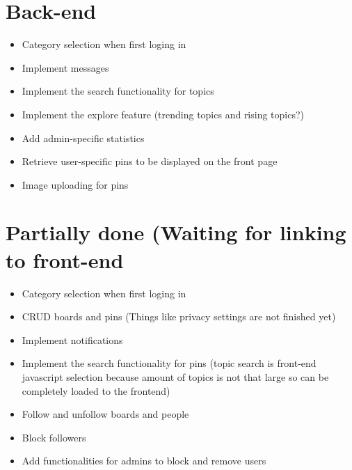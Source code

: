 \documentclass{article}
\begin{document}
\section{Back-end}
\begin{itemize}
\item Category selection when first loging in
\item Implement messages
\item Implement the search functionality for topics
\item Implement the explore feature (trending topics and rising topics?)
\item Add admin-specific statistics
\item Retrieve user-specific pins to be displayed on the front page
\item Image uploading for pins
\end{itemize}

\section{Partially done (Waiting for linking to front-end}
\begin{itemize}
\item Category selection when first loging in
\item CRUD boards and pins  (Things like privacy settings are not finished yet)
\item Implement notifications
\item Implement the search functionality for pins (topic search is front-end javascript selection because amount of topics is not that large so can be completely loaded to the frontend)
\item Follow and unfollow boards and people
\item Block followers
\item Add functionalities for admins to block and remove users
\end{itemize}
\end{document}
